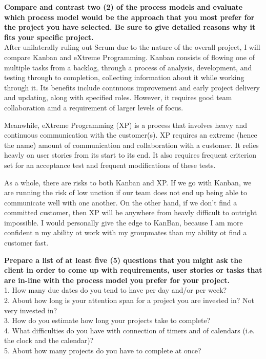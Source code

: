 \documentclass[12pt]{article}
\begin{document}
\textbf{Compare and contrast two (2) of the process models and evaluate which process model would be the approach that you most prefer for the project you have selected.  Be sure to give detailed reasons why it fits your specific project.}\\
After unilaterally ruling out Scrum due to the nature of the overall project, I will compare Kanban and eXtreme Programming.
Kanban consists of flowing one of multiple tasks from a backlog, through a process of analysis, development, and testing through to completion, collecting information about it while working through it. Its benefits include contnuous improvement and early project delivery and updating, along with specified roles. However, it requires good team collaboration amd a requirement of larger levels of focus.

Meanwhile, eXtreme Programming (XP) is a process that involves heavy and continuous communication with the customer(s). XP requires an extreme (hence the name) amount of communication and collaboration with a customer. It relies heavly on user stories from its start to its end. It also requires frequent criterion set for an acceptance test and frequent modifications of these tests.

As a whole, there are risks to both Kanban and XP. If we go with Kanban, we are running the risk of low unction if our team does not end up being able to communicate well with one another. On the other hand, if we don't find a committed customer, then XP will be anywhere from heavly difficult to outright impossible. I would personally give the edge to KanBan, because I am more confident n my ability ot work with my groupmates than my ability ot find a customer fast.


\textbf{Prepare a list of at least five (5) questions that you might ask the client in order to come up with requirements, user stories or tasks that are in-line with the process model you prefer for your project.}\\
1. How many due dates do you tend to have per day and/or per week?\\
2. About how long is your attention span for a project you are invested in? Not very invested in?\\
3. How do you estimate how long your projects take to complete?\\
4. What difficulties do you have with connection of timers and of calendars (i.e. the clock and the calendar)?\\
5. About how many projects do you have to complete at once?
\end{document}
